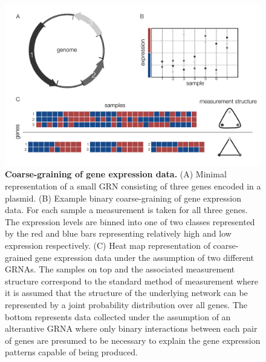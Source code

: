 \begin{figure}[!ht]
\centering
\noindent\includegraphics[width=0.9\columnwidth]{fig/figure_expression_concept.pdf}
\caption{{\bf Coarse-graining of gene expression data.} (A) Minimal representation of a small GRN consisting of three genes encoded in a plasmid. (B) Example binary coarse-graining of gene expression data. For each sample a measurement is taken for all three genes. The expression levels are binned into one of two classes represented by the red and blue bars representing relatively high and low expression respectively. (C) Heat map representation of coarse-grained gene expression data under the assumption of two different GRNAs. The samples on top and the associated measurement structure correspond to the standard method of measurement where it is assumed that the structure of the underlying network can be represented by a joint probability distribution over all genes. The bottom represents data collected under the assumption of an alterantive GRNA where only binary interactions between each pair of genes are presumed to be necessary to explain the gene expression patterns capable of being produced.}
\label{fig:expression_concept}
\end{figure}

